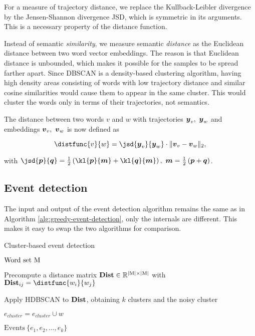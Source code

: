 For a measure of trajectory distance, we replace the Kullback-Leibler divergence by the Jensen-Shannon divergence JSD, which is symmetric in its arguments. This is a necessary property of the distance function.

Instead of semantic \textit{similarity}, we measure semantic \textit{distance} as the Euclidean distance between two word vector embeddings. The reason is that Euclidean distance is unbounded, which makes it possible for the samples to be spread farther apart. Since DBSCAN is a density-based clustering algorithm, having high density areas consisting of words with low trajectory distance and similar cosine similarities would cause them to appear in the same cluster. This would cluster the words only in terms of their trajectories, not semantics.

The distance between two words $v$ and $w$ with trajectories $\vect{\traj}_{v},\ \vect{\traj}_{w}$ and embeddings $\embed_{v},\ \embed_{w}$ is now defined as

\begin{equation}
	\distfunc{v}{w} = \jsd{\vect{\traj}_{v}}{\vect{\traj}_{w}} \cdot \| \embed_{v} - \embed_{w}\|_{2},
\end{equation}

with $\jsd{\vect{p}}{\vect{q}} = \frac{1}{2} \left( \kl{\vect{p}}{\vect{m}} + \kl{\vect{q}}{\vect{m}} \right) ,\ \vect{m} = \frac{1}{2} \left( \vect{p} + \vect{q} \right)$.


\subsection{Event detection}
The input and output of the event detection algorithm remains the same as in Algorithm \ref{alg:greedy-event-detection}, only the internals are different. This makes it easy to swap the two algorithms for comparison.

\begin{algorithm}[H]
\begin{algorithmic}[1]
\caption{Cluster-based event detection}
\Input $\text{Word set} ~ \text{M}$

\State Precompute a distance matrix $\mathbf{Dist} \in \mathbb{R}^{\left\vert \text{M} \right\vert \times \left\vert \text{M} \right\vert}$ with $\distmat_{ij} = \distfunc{w_{i}}{w_{j}}$

\State Apply HDBSCAN to $\mathbf{Dist}$, obtaining $k$ clusters and the noisy cluster

		\State $e_{cluster} = e_{cluster} \cup w$
	\EndIf
\EndFor

\Output $\text{Events} ~ \{ e_{1}, e_{2}, \dots, e_{k} \}$
\end{algorithmic}
\end{algorithm}
